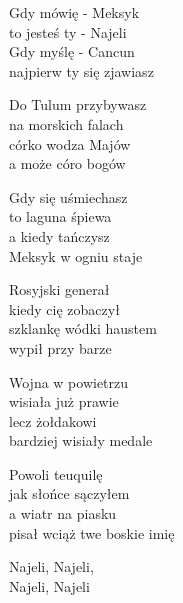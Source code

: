 \begin{text}
    Gdy mówię - Meksyk\\
    to jesteś ty - Najeli\\
    Gdy myślę - Cancun\\
    najpierw ty się zjawiasz

    Do Tulum przybywasz\\
    na morskich falach\\
    córko wodza Majów\\
    a może córo bogów

    Gdy się uśmiechasz\\
    to laguna śpiewa\\
    a kiedy tańczysz\\
    Meksyk w ogniu staje

    Rosyjski generał\\
    kiedy cię zobaczył\\
    szklankę wódki haustem\\
    wypił przy barze

    Wojna w powietrzu\\
    wisiała już prawie\\
    lecz żołdakowi\\
    bardziej wisiały medale

    Powoli teuquilę\\
    jak słońce sączyłem\\
    a wiatr na piasku\\
    pisał wciąż twe boskie imię

    Najeli, Najeli,\\
    Najeli, Najeli
\end{text}
\begin{chord}

\end{chord}
